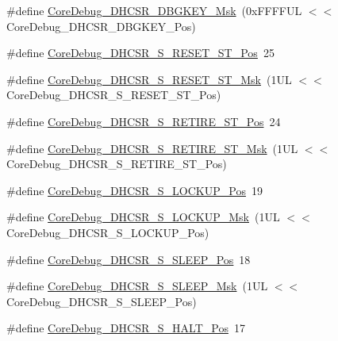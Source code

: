 \begin{DoxyCompactItemize}
\item 
\#define \mbox{\hyperlink{group___c_m_s_i_s___core_debug_ga1ce997cee15edaafe4aed77751816ffc}{Core\+Debug\+\_\+\+D\+H\+C\+S\+R\+\_\+\+D\+B\+G\+K\+E\+Y\+\_\+\+Msk}}~(0x\+F\+F\+F\+F\+U\+L $<$$<$ Core\+Debug\+\_\+\+D\+H\+C\+S\+R\+\_\+\+D\+B\+G\+K\+E\+Y\+\_\+\+Pos)
\item 
\#define \mbox{\hyperlink{group___c_m_s_i_s___core_debug_ga6f934c5427ea057394268e541fa97753}{Core\+Debug\+\_\+\+D\+H\+C\+S\+R\+\_\+\+S\+\_\+\+R\+E\+S\+E\+T\+\_\+\+S\+T\+\_\+\+Pos}}~25
\item 
\#define \mbox{\hyperlink{group___c_m_s_i_s___core_debug_gac474394bcceb31a8e09566c90b3f8922}{Core\+Debug\+\_\+\+D\+H\+C\+S\+R\+\_\+\+S\+\_\+\+R\+E\+S\+E\+T\+\_\+\+S\+T\+\_\+\+Msk}}~(1\+U\+L $<$$<$ Core\+Debug\+\_\+\+D\+H\+C\+S\+R\+\_\+\+S\+\_\+\+R\+E\+S\+E\+T\+\_\+\+S\+T\+\_\+\+Pos)
\item 
\#define \mbox{\hyperlink{group___c_m_s_i_s___core_debug_ga2328118f8b3574c871a53605eb17e730}{Core\+Debug\+\_\+\+D\+H\+C\+S\+R\+\_\+\+S\+\_\+\+R\+E\+T\+I\+R\+E\+\_\+\+S\+T\+\_\+\+Pos}}~24
\item 
\#define \mbox{\hyperlink{group___c_m_s_i_s___core_debug_ga89dceb5325f6bcb36a0473d65fbfcfa6}{Core\+Debug\+\_\+\+D\+H\+C\+S\+R\+\_\+\+S\+\_\+\+R\+E\+T\+I\+R\+E\+\_\+\+S\+T\+\_\+\+Msk}}~(1\+U\+L $<$$<$ Core\+Debug\+\_\+\+D\+H\+C\+S\+R\+\_\+\+S\+\_\+\+R\+E\+T\+I\+R\+E\+\_\+\+S\+T\+\_\+\+Pos)
\item 
\#define \mbox{\hyperlink{group___c_m_s_i_s___core_debug_ga2900dd56a988a4ed27ad664d5642807e}{Core\+Debug\+\_\+\+D\+H\+C\+S\+R\+\_\+\+S\+\_\+\+L\+O\+C\+K\+U\+P\+\_\+\+Pos}}~19
\item 
\#define \mbox{\hyperlink{group___c_m_s_i_s___core_debug_ga7b67e4506d7f464ef5dafd6219739756}{Core\+Debug\+\_\+\+D\+H\+C\+S\+R\+\_\+\+S\+\_\+\+L\+O\+C\+K\+U\+P\+\_\+\+Msk}}~(1\+U\+L $<$$<$ Core\+Debug\+\_\+\+D\+H\+C\+S\+R\+\_\+\+S\+\_\+\+L\+O\+C\+K\+U\+P\+\_\+\+Pos)
\item 
\#define \mbox{\hyperlink{group___c_m_s_i_s___core_debug_ga349ccea33accc705595624c2d334fbcb}{Core\+Debug\+\_\+\+D\+H\+C\+S\+R\+\_\+\+S\+\_\+\+S\+L\+E\+E\+P\+\_\+\+Pos}}~18
\item 
\#define \mbox{\hyperlink{group___c_m_s_i_s___core_debug_ga98d51538e645c2c1a422279cd85a0a25}{Core\+Debug\+\_\+\+D\+H\+C\+S\+R\+\_\+\+S\+\_\+\+S\+L\+E\+E\+P\+\_\+\+Msk}}~(1\+U\+L $<$$<$ Core\+Debug\+\_\+\+D\+H\+C\+S\+R\+\_\+\+S\+\_\+\+S\+L\+E\+E\+P\+\_\+\+Pos)
\item 
\#define \mbox{\hyperlink{group___c_m_s_i_s___core_debug_ga760a9a0d7f39951dc3f07d01f1f64772}{Core\+Debug\+\_\+\+D\+H\+C\+S\+R\+\_\+\+S\+\_\+\+H\+A\+L\+T\+\_\+\+Pos}}~17
$$
\end{DoxyCompactItemize}
